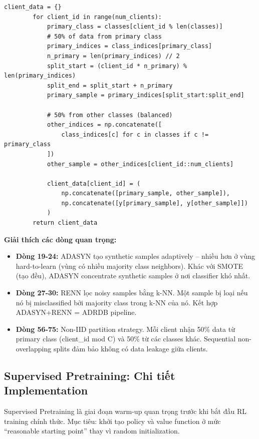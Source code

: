 \documentclass[12pt,a4paper]{article}
\begin{document}
\begin{lstlisting}[caption=Data Preprocessor, label=lst:preprocessor]
        client_data = {}
        for client_id in range(num_clients):
            primary_class = classes[client_id % len(classes)]
            # 50% of data from primary class
            primary_indices = class_indices[primary_class]
            n_primary = len(primary_indices) // 2
            split_start = (client_id * n_primary) % len(primary_indices)
            split_end = split_start + n_primary
            primary_sample = primary_indices[split_start:split_end]

            # 50% from other classes (balanced)
            other_indices = np.concatenate([
                class_indices[c] for c in classes if c != primary_class
            ])
            other_sample = other_indices[client_id::num_clients]

            client_data[client_id] = (
                np.concatenate([primary_sample, other_sample]),
                np.concatenate([y[primary_sample], y[other_sample]])
            )
        return client_data
\end{lstlisting}

\textbf{Giải thích các dòng quan trọng:}
\begin{itemize}
    \item \textbf{Dòng 19-24:} ADASYN tạo synthetic samples adaptively -- nhiều hơn ở vùng hard-to-learn (vùng có nhiều majority class neighbors). Khác với SMOTE (tạo đều), ADASYN concentrate synthetic samples ở nơi classifier khó nhất.
    \item \textbf{Dòng 27-30:} RENN lọc noisy samples bằng k-NN. Một sample bị loại nếu nó bị misclassified bởi majority class trong k-NN của nó. Kết hợp ADASYN+RENN = ADRDB pipeline.
    \item \textbf{Dòng 56-75:} Non-IID partition strategy. Mỗi client nhận 50\% data từ primary class (client\_id mod C) và 50\% từ các classes khác. Sequential non-overlapping splits đảm bảo không có data leakage giữa clients.
\end{itemize}

\subsection{Supervised Pretraining: Chi tiết Implementation}

Supervised Pretraining là giai đoạn warm-up quan trọng trước khi bắt đầu RL training chính thức. Mục tiêu: khởi tạo policy và value function ở mức ``reasonable starting point'' thay vì random initialization.
\end{document}
